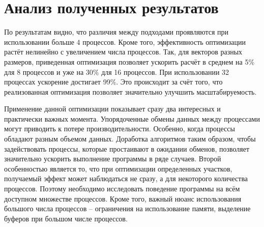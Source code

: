 \documentclass[12pt, oneside, a4paper]{article}
\begin{document}
\section{Анализ полученных результатов}

По результатам видно, что различия между подходами проявляются при использовании больше 4 процессов. Кроме того, эффективность оптимизации растёт нелинейно с увеличением числа процессов. Так, для векторов разных размеров, приведенная оптимизация позволяет ускорить расчёт в среднем на 5\% для 8 процессов и уже на 30\% для 16 процессов. При использовании 32 процессах ускорение достигает 99\%. Это происходит за счёт того, что реализованная оптимизация позволяет значительно улучшить масштабируемость.


Применение данной оптимизации показывает сразу два интересных и практически важных момента. Упорядоченные обмены данных между процессами могут приводить к потере производительности. Особенно, когда процессы обладают разным объемом данных. Доработка алгоритмов таким образом, чтобы задействовать процессы, которые простаивают в ожидании обменов, позволяет значительно ускорить выполнение программы в ряде случаев. Второй особенностью является то, что при оптимизации определенных участков, получаемый эффект может наблюдаться не сразу, а для некоторого количества процессов. Поэтому необходимо исследовать поведение программы на всём доступном множестве процессов. Кроме того, важный нюанс использования большого числа процессов -- ограничения на использование памяти, выделение буферов при большом числе процессов.
\end{document}
